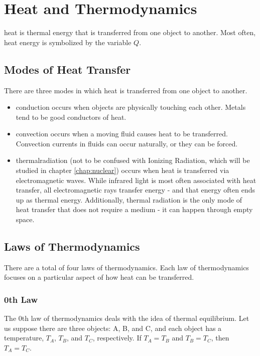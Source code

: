 \chapter{Heat and Thermodynamics}

	\gls{heat} is thermal energy that is transferred from one object to another.  Most often, heat energy is symbolized by the variable $Q$.  
	\section{Modes of Heat Transfer}
	There are three modes in which heat is transferred from one object to another.   \begin{itemize}
		\item \gls{conduction} occurs when objects are physically touching each other.  Metals tend to be good conductors of heat. 
		\item   \gls{convection} occurs when a moving fluid causes heat to be transferred.  Convection currents in fluids can occur naturally, or they can be forced. 
		\item  \gls{thermalradiation} (not to be confused with Ionizing Radiation, which will be studied in chapter \ref{chap:nuclear}) occurs when heat is transferred via electromagnetic waves.  While infrared light is most often associated with heat transfer, all electromagnetic rays transfer energy - and that energy often ends up as thermal energy.  Additionally, thermal radiation is the only mode of heat transfer that does not require a medium - it can happen through empty space.
		\end{itemize}
	
	\section{Laws of Thermodynamics}
	
	There are a total of four laws of thermodynamics.  Each law of thermodynamics focuses on a particular aspect of how heat can be transferred. 
	
	\subsection{0th Law}
	
	The 0th law of thermodynamics deals with the idea of thermal equilibrium.  Let us suppose there are three objects: A, B, and C, and each object has a temperature, $T_A$, $T_B$, and $T_C$, respectively.  If $T_A = T_B$ and $T_B = T_C$, then $T_A = T_C$.  
	
